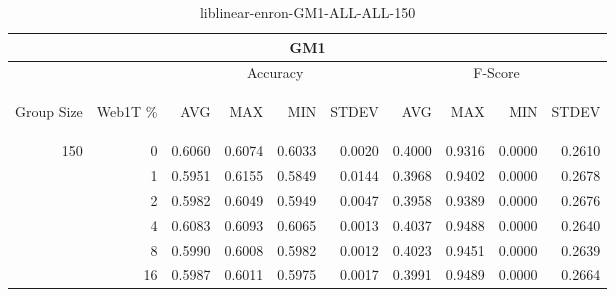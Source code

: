 \begin{center}
\begin{table}[htbp] 
 \begin{center}
\begin{tabular}{ | r | r | r | r | r | r | r | r | r | r |}
\hline
\multicolumn{10}{|c|}{GM1}\\
\hline
 & & \multicolumn{4}{|c|}{Accuracy} & \multicolumn{4}{|c|}{F-Score}\\ \cline{3-10}
\begin{sideways}Group Size\end{sideways} & \begin{sideways}Web1T \%\end{sideways} & \begin{sideways}AVG\end{sideways} & \begin{sideways}MAX\end{sideways} & \begin{sideways}MIN\end{sideways} & \begin{sideways}STDEV\end{sideways} & \begin{sideways}AVG\end{sideways} & \begin{sideways}MAX\end{sideways} & \begin{sideways}MIN\end{sideways} & \begin{sideways}STDEV\end{sideways}\\
\hline
\multirow{5}{*}{150}
 & 0 & 0.6060 & 0.6074 & 0.6033 & 0.0020 & 0.4000 & 0.9316 & 0.0000 & 0.2610\\ \cline{2-10}
 & 1 & 0.5951 & 0.6155 & 0.5849 & 0.0144 & 0.3968 & 0.9402 & 0.0000 & 0.2678\\ \cline{2-10}
 & 2 & 0.5982 & 0.6049 & 0.5949 & 0.0047 & 0.3958 & 0.9389 & 0.0000 & 0.2676\\ \cline{2-10}
 & 4 & 0.6083 & 0.6093 & 0.6065 & 0.0013 & 0.4037 & 0.9488 & 0.0000 & 0.2640\\ \cline{2-10}
 & 8 & 0.5990 & 0.6008 & 0.5982 & 0.0012 & 0.4023 & 0.9451 & 0.0000 & 0.2639\\ \cline{2-10}
 & 16 & 0.5987 & 0.6011 & 0.5975 & 0.0017 & 0.3991 & 0.9489 & 0.0000 & 0.2664\\ \cline{2-10}
\hline
\end{tabular}
\caption{liblinear-enron-GM1-ALL-ALL-150}
\label{table:liblinear-enron-GM1-ALL-ALL-150}
\end{center}
 \end{table}
\end{center}

